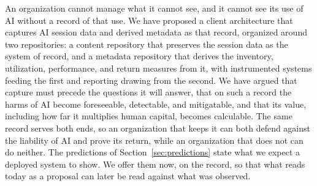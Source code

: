 \documentclass[11pt]{article}
\begin{document}
An organization cannot manage what it cannot see, and it cannot see its use of AI
without a record of that use. We have proposed a client architecture that captures
AI session data and derived metadata as that record, organized around two
repositories: a content repository that preserves the session data as the system
of record, and a metadata repository that derives the inventory, utilization,
performance, and return measures from it, with instrumented systems feeding the
first and reporting drawing from the second. We have
argued that capture must precede the questions it will answer, that on such a record
the harms of AI become foreseeable, detectable, and mitigatable, and that its value,
including how far it multiplies human capital, becomes calculable. The same record
serves both ends, so an organization that keeps it can both defend against the
liability of AI and prove its return, while an organization that does not can do
neither. The predictions of Section~\ref{sec:predictions} state what we expect a
deployed system to show. We offer them now, on the record, so that what reads today
as a proposal can later be read against what was observed.



\end{document}

